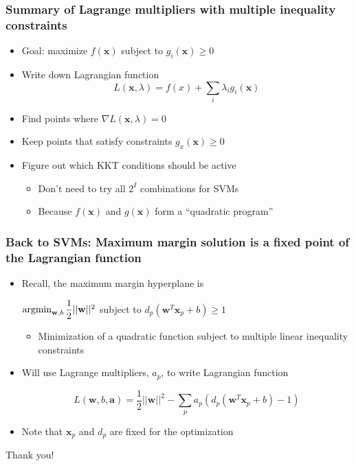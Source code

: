 \documentclass[12pt,notes,mathserif]{beamer}
\newcommand{\chuhao}{\fontsize{44.9pt}{\baselineskip}\selectfont}
\begin{document}
\begin{frame}[c]
\frametitle{Summary of Lagrange multipliers with multiple inequality constraints}
\begin{itemize}
\item Goal: maximize $f(\mathbf{x})$ subject to $g_i(\mathbf{x})\geqslant{} 0$
\item Write down Lagrangian function
\[
L(\mathbf{x},\lambda)=f(x)+\sum_i\lambda_ig_i(\mathbf{x})
\]
\item Find points where $\nabla L(\mathbf{x},\lambda)= 0$
\item Keep points that satisfy constraints $g_x(\mathbf{x})\geqslant{}0$
\item Figure out which KKT conditions should be active
\begin{itemize}
\item Don't need to try all $2^I$ combinations for SVMs
\item Because $f(\mathbf{x})$ and $g(\mathbf{x})$ form a ``quadratic program''
\end{itemize}
\end{itemize}
\end{frame}

\begin{frame}[c]
\frametitle{Back to SVMs: Maximum margin solution is a fixed point of the Lagrangian function}
\begin{itemize}
\item Recall, the maximum margin hyperplane is

$\mathop{\mathrm{argmin}}_{\mathbf{w},b} \dfrac{1}{2}||\mathbf{w}||^2$ subject to $d_p(\mathbf{w}^T \mathbf{x}_p+b)\geqslant{}1$
\begin{itemize}
\item Minimization of a quadratic function subject to multiple linear inequality constraints
\end{itemize}
\item Will use Lagrange multipliers, $a_p$, to write Lagrangian function

$$L(\mathbf{w},b,\mathbf{a})=\dfrac{1}{2}||\mathbf{w}||^2-\sum_{p}a_p(d_p( \mathbf{w} ^T\mathbf{x}_p+b)-1)$$

\item Note that $\mathbf{x}_p$ and $d_p$ are fixed for the optimization
\end{itemize}
\end{frame}




\begin{frame}
\begin{center}
\chuhao Thank you! %
\end{center}
\end{frame}
\end{document}
